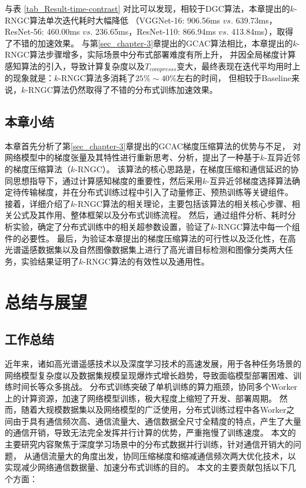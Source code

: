 \documentclass{xdupgthesis}
\begin{document}
与表 \ref*{tab_Result-time-contrast} 对比可以发现，相较于DGC算法，本章提出的$k$-RNGC算法单次迭代耗时大幅降低
（VGGNet-16: 906.56ms $vs.$ 639.73ms，ResNet-56: 460.00ms $vs.$ 236.65ms，ResNet-110: 866.94ms $vs.$ 413.84ms），取得了不错的加速效果。
与第\ref{sec_chapter-3}章提出的GCAC算法相比，本章提出的$k$-RNGC算法步骤增多，实际场景中分布式部署难度有所上升，
并因全局梯度计算感知算法的引入，导致计算复杂度以及$T_{compresss}$变大，最终表现在迭代平均用时上的现象就是：$k$-RNGC算法多消耗了$25\%\sim  40\%$左右的时间，
但相较于Baseline来说，$k$-RNGC算法仍然取得了不错的分布式训练加速效果。

\section{本章小结}
\label{sec_chapter4-Summary}
本章首先分析了第\ref*{sec_chapter-3}章提出的GCAC梯度压缩算法的优势与不足，
对网络模型中的梯度张量及其特性进行重新思考、分析，提出了一种基于$k$-互异近邻的梯度压缩算法（$k$-RNGC）。
该算法的核心思路是，在梯度压缩和通信延迟的协同思想指导下，通过计算感知梯度的重要性，然后采用$k$-互异近邻梯度选择算法确定待传输梯度，并在分布式训练过程中引入了动量修正、预热训练等关键组件。
接着，详细介绍了$k$-RNGC算法的相关理论，主要包括该算法的相关核心步骤、相关公式及其作用、整体框架以及分布式训练流程。
然后，通过组件分析、耗时分析实验，确定了分布式训练中的相关超参数设置，验证了$k$-RNGC算法中每一个组件的必要性。
最后，为验证本章提出的梯度压缩算法的可行性以及泛化性，在高光谱遥感数据集以及自然图像数据集上进行了高光谱目标检测和图像分类两大任务，实验结果证明了$k$-RNGC算法的有效性以及通用性。



\chapter{总结与展望}
\section{工作总结}
近年来，诸如高光谱遥感技术以及深度学习技术的高速发展，用于各种任务场景的网络模型复杂度以及数据集规模呈现爆炸式增长趋势，导致面临模型部署困难、训练时间长等众多挑战。
分布式训练突破了单机训练的算力瓶颈，协同多个Worker上的计算资源，加速了网络模型训练，极大程度上缩短了开发、部署周期。
然而，随着大规模数据集以及网络模型的广泛使用，分布式训练过程中各Worker之间由于具有通信频次高、通信流量大、通信数据全尺寸全精度的特点，产生了大量的通信开销，导致无法完全发挥并行计算的优势，严重拖慢了训练速度。
本文的主要研究内容聚焦于深度学习场景中的分布式数据并行训练，针对通信开销大的问题，
从通信流量大的角度出发，协同压缩梯度和缩减通信频次两大优化技术，以实现减少网络通信数据量、加速分布式训练的目的。
本文的主要贡献包括以下几个方面：
\end{document}
